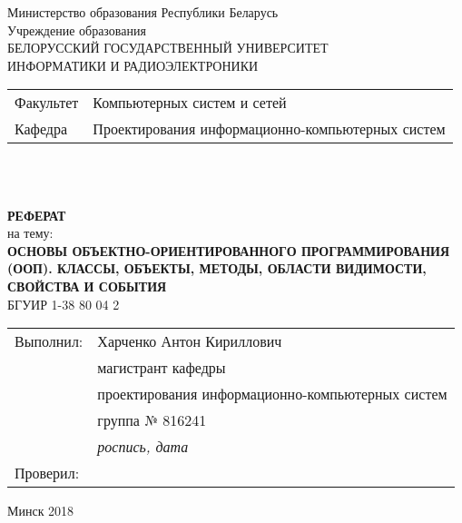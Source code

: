 \begin{titlepage}
  \begin{center}
    Министерство образования Республики Беларусь\\[1em]
    Учреждение образования\\
    БЕЛОРУССКИЙ ГОСУДАРСТВЕННЫЙ УНИВЕРСИТЕТ \\
    ИНФОРМАТИКИ И РАДИОЭЛЕКТРОНИКИ\\[1em]

    \begin{minipage}{\textwidth}
      \begin{flushleft}
        \begin{tabular}{ l l }
          Факультет & Компьютерных систем и сетей\\
          Кафедра   & Проектирования информационно-компьютерных систем
        \end{tabular}
      \end{flushleft}
    \end{minipage}\\[3em]

	\begin{minipage}{0.4\textwidth}
		
	\end{minipage}\\[2.2em]

    \textbf{РЕФЕРАТ}\\
    {на тему:}\\[1em]
    \textbf{\large\MakeUppercase{Основы объектно-ориентированного программирования (ООП). Классы, объекты, методы, области видимости, свойства и события}}\\[1em]

    {БГУИР 1-38 80 04 2}\\[2em]
    
    \begin{flushright}
      \begin{tabular}{ l l }
        Выполнил: & Харченко Антон Кириллович\\
        & магистрант кафедры\\
        & проектирования информационно-компьютерных систем\\
        & группа № 816241\\
        & \underline{\hspace*{2.8cm}} \textit{роспись, дата}\\
        Проверил: & \\
      \end{tabular}
    \end{flushright}
    
    \vfill
    {\normalsize Минск 2018}
  \end{center}
\end{titlepage}